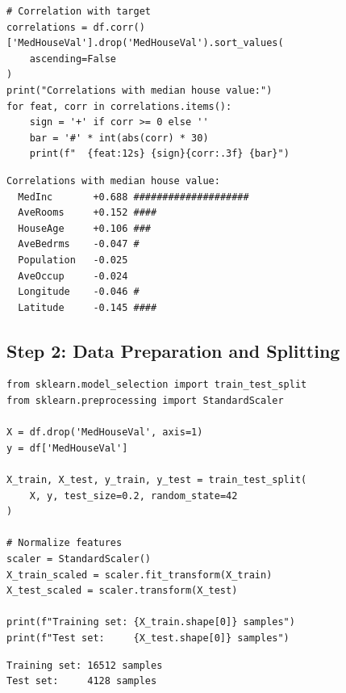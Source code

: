 \begin{codeblock}[title=\textbf{Python}]
\begin{verbatim}
# Correlation with target
correlations = df.corr()['MedHouseVal'].drop('MedHouseVal').sort_values(
    ascending=False
)
print("Correlations with median house value:")
for feat, corr in correlations.items():
    sign = '+' if corr >= 0 else ''
    bar = '#' * int(abs(corr) * 30)
    print(f"  {feat:12s} {sign}{corr:.3f} {bar}")
\end{verbatim}
\end{codeblock}

\begin{codeoutput}
\begin{verbatim}
Correlations with median house value:
  MedInc       +0.688 ####################
  AveRooms     +0.152 ####
  HouseAge     +0.106 ###
  AveBedrms    -0.047 #
  Population   -0.025
  AveOccup     -0.024
  Longitude    -0.046 #
  Latitude     -0.145 ####
\end{verbatim}
\end{codeoutput}

\subsection{Step 2: Data Preparation and Splitting}

\begin{codeblock}[title=\textbf{Python}]
\begin{verbatim}
from sklearn.model_selection import train_test_split
from sklearn.preprocessing import StandardScaler

X = df.drop('MedHouseVal', axis=1)
y = df['MedHouseVal']

X_train, X_test, y_train, y_test = train_test_split(
    X, y, test_size=0.2, random_state=42
)

# Normalize features
scaler = StandardScaler()
X_train_scaled = scaler.fit_transform(X_train)
X_test_scaled = scaler.transform(X_test)

print(f"Training set: {X_train.shape[0]} samples")
print(f"Test set:     {X_test.shape[0]} samples")
\end{verbatim}
\end{codeblock}

\begin{codeoutput}
\begin{verbatim}
Training set: 16512 samples
Test set:     4128 samples
\end{verbatim}
\end{codeoutput}

